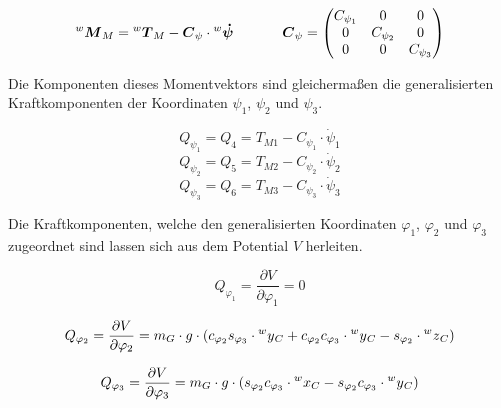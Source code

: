 \begin{equation}
\prescript{w}{}{}\boldsymbol{M}_M = \prescript{w}{}{}\boldsymbol{T}_M - \boldsymbol{C}_{\psi} \cdot \prescript{w}{}{}\boldsymbol{\dot {\psi}} \hspace{35pt} \boldsymbol{C}_{\psi} = \begin{pmatrix}
C_{\psi_1} & 0 & 0 \\
0 & C_{\psi_2} & 0 \\
0 & 0 & C_{\psi_3}
\end{pmatrix}
\end{equation}

Die Komponenten dieses Momentvektors sind gleichermaßen die generalisierten Kraftkomponenten der Koordinaten $\psi_1$, $\psi_2$ und $\psi_3$.

\begin{equation}
Q_{\psi_1} = Q_4 = T_{M1} - C_{\psi_1} \cdot \dot{\psi}_1
\end{equation}
\begin{equation}
Q_{\psi_2} = Q_5 = T_{M2} - C_{\psi_2} \cdot \dot{\psi}_2
\end{equation}
\begin{equation}
Q_{\psi_3} = Q_6 = T_{M3} - C_{\psi_3} \cdot \dot{\psi}_3
\end{equation}

Die Kraftkomponenten, welche den generalisierten Koordinaten $\varphi_1$, $\varphi_2$ und $\varphi_3$ zugeordnet sind lassen sich aus dem Potential $V$ herleiten.

\begin{equation}
Q_{\varphi_1} = \frac{\partial V}{\partial \varphi_1} = 0
\end{equation}

\begin{equation}
Q_{\varphi_2} = \frac{\partial V}{\partial \varphi_2} = m_G \cdot g \cdot (c_{\varphi_2} s_{\varphi_3} \cdot \prescript{w}{}{y}_C + c_{\varphi_2}c_{\varphi_3} \cdot \prescript{w}{}{y}_C - s_{\varphi_2} \cdot \prescript{w}{}{z}_C)
\end{equation}

\begin{equation}
Q_{\varphi_3} = \frac{\partial V}{\partial \varphi_3} = m_G \cdot g \cdot (s_{\varphi_2} c_{\varphi_3} \cdot \prescript{w}{}{x}_C - s_{\varphi_2} c_{\varphi_3} \cdot \prescript{w}{}{y}_C)
\end{equation}




